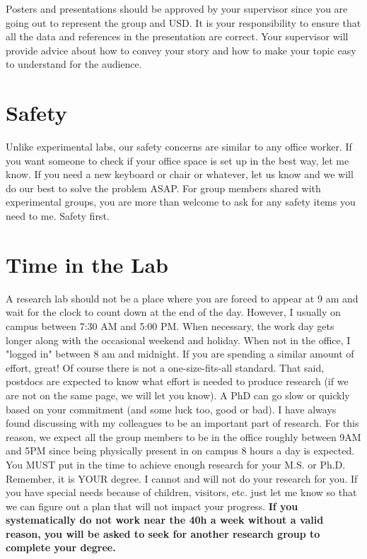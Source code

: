 \documentclass[letterpaper]{article}
\begin{document}
Posters and presentations should be approved by your supervisor since you are going out to represent the group and USD. It is your responsibility to ensure that all the data and references in the presentation are correct. Your supervisor will provide advice about how to convey your story and how to make your topic easy to understand for the audience.


\section*{Safety}

Unlike experimental labs, our safety concerns are similar to any office worker. If you want someone to check if your office space is set up in the best way, let me know. If you need a new keyboard or chair or whatever, let us know and we will do our best to solve the problem ASAP. For group members shared with experimental groups, you are more than welcome to ask for any safety items you need to me. Safety first. 

\section*{Time in the Lab}
A research lab should not be a place where you are forced to appear at 9 am and wait for the clock to count down at the end of the day. However, I usually on campus between 7:30 AM and 5:00 PM. When necessary, the work day gets longer along with the occasional weekend and holiday. When not in the office, I  "logged in" between 8 am and midnight. If you are spending a similar amount of effort, great! Of course there is not a one-size-fits-all standard. That said, postdocs are expected to know what effort is needed to produce research (if we are not on the same page, we will let you know). A PhD can go slow or quickly based on your commitment (and some luck too, good or bad). I have always found discussing with my colleagues to be an important part of research. For this reason, we expect all the group members to be in the office roughly between 9AM and 5PM since being physically present in on campus 8 hours a day is expected. You MUST put in the time to achieve enough research for your M.S. or Ph.D. Remember, it is YOUR degree. I cannot and will not do your research for you. If you have special needs because of children, visitors, etc. just let me know so that we can figure out a plan that will not impact your progress. \textbf{If you systematically do not work near the 40h a week without a valid reason, you will be asked to seek for another research group to complete your degree.}
\end{document}
